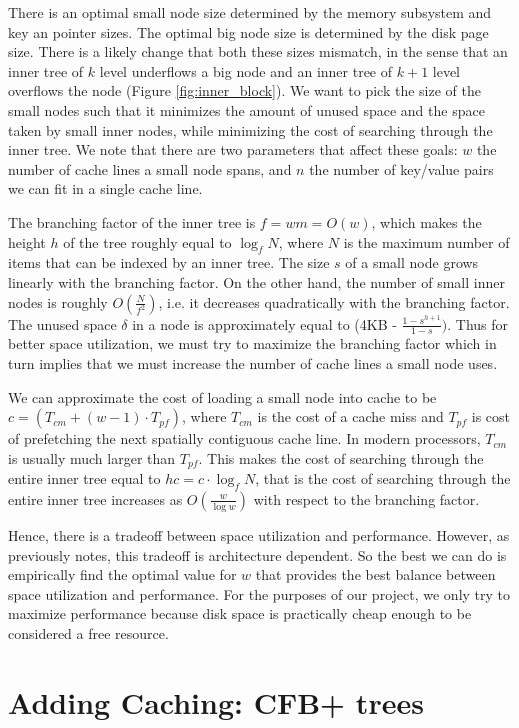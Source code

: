 \documentclass{article}
\begin{document}
There is an optimal small node size determined by the memory subsystem and key an pointer sizes. The optimal big node size is determined by the disk page size. There is a likely change that both these sizes  mismatch, in the sense that an inner tree of $k$ level underflows a big node and an inner tree of $k+1$ level overflows the node (Figure \ref{fig:inner_block}). We want to pick the size of the small nodes such that it minimizes the amount of unused space and the space taken by small inner nodes, while minimizing the cost of searching through the inner tree. We note that there are two parameters that affect these goals: $w$ the number of cache lines a small node spans, and $n$ the number of key/value pairs we can fit in a single cache line. 

The branching factor of the inner tree is $f=wm = O(w)$, which makes the height $h$ of the tree roughly equal to $\log_f N$, where $N$ is the maximum number of items that can be indexed by an inner tree. The size $s$ of a small node grows linearly with the branching factor. On the other hand, the number of small inner nodes is roughly $O(\frac{N}{f^2})$, i.e. it decreases quadratically with the branching factor. The unused space $\delta$ in a node is approximately equal to (4KB - $\frac{1-s^{h+1}}{1-s})$. Thus for better space utilization, we must try to maximize the branching factor which in turn implies that we must increase the number of cache lines a small node uses.

We can approximate the cost of loading a small node into cache to be $c = (T_{cm} + (w-1)\cdot T_{pf})$, where $T_{cm}$ is the cost of a cache miss and $T_{pf}$ is cost of prefetching the next spatially contiguous cache line. In modern processors, $T_{cm}$ is usually much larger than $T_{pf}$. This makes the cost of searching through the entire inner tree equal to $hc = c\cdot \log_f N$, that is the cost of searching through the entire inner tree increases as $O(\frac{w}{\log w})$ with respect to the branching factor.

Hence, there is a tradeoff between space utilization and performance. However, as previously notes, this tradeoff is architecture dependent. So the best we can do is empirically find the optimal value for $w$ that provides the best balance between space utilization and performance. For the purposes of our project, we only try to maximize performance because disk space is practically cheap enough to be considered a free resource.

\section{Adding Caching: CFB+ trees}
\end{document}

